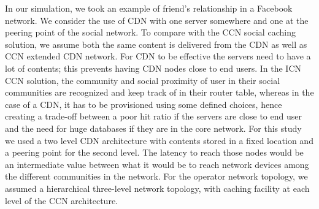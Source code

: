 In our simulation, we took an example of friend’s relationship in a Facebook network. We consider the use of CDN with one server somewhere and one at the peering point of the social network. To compare with the CCN social caching solution, we assume both the same content is delivered from the CDN as well as CCN extended CDN network. For CDN to be effective the servers need to have a lot of contents; this prevents having CDN nodes close to end users. In the ICN CCN solution, the community and social proximity of user in their social communities are recognized and keep track of in their router table, whereas in the case of a CDN, it has to be provisioned using some defined choices, hence creating a trade-off between a poor hit ratio if the servers are close to end user and the need for huge databases if they are in the core network. For this study we used a two level CDN architecture with contents stored in a fixed location and a peering point for the second level. The latency to reach those nodes would be an intermediate value between what it would be to reach network devices among the different communities in the network. For the operator network topology, we assumed a hierarchical three-level network topology, with caching facility at each level of the CCN architecture. 



